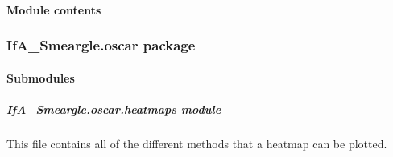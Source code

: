 \documentclass[letterpaper,10pt,english]{sphinxmanual}
\begin{document}
\paragraph{Module contents}
\label{\detokenize{python_docstrings/IfA_Smeargle.meta:module-IfA_Smeargle.meta}}\label{\detokenize{python_docstrings/IfA_Smeargle.meta:module-contents}}

\subsubsection{IfA\_Smeargle.oscar package}
\label{\detokenize{python_docstrings/IfA_Smeargle.oscar:ifa-smeargle-oscar-package}}\label{\detokenize{python_docstrings/IfA_Smeargle.oscar::doc}}

\paragraph{Submodules}
\label{\detokenize{python_docstrings/IfA_Smeargle.oscar:submodules}}

\subparagraph{IfA\_Smeargle.oscar.heatmaps module}
\label{\detokenize{python_docstrings/IfA_Smeargle.oscar.heatmaps:module-IfA_Smeargle.oscar.heatmaps}}\label{\detokenize{python_docstrings/IfA_Smeargle.oscar.heatmaps:ifa-smeargle-oscar-heatmaps-module}}\label{\detokenize{python_docstrings/IfA_Smeargle.oscar.heatmaps::doc}}
This file contains all of the different methods that a heatmap can be plotted.
\end{document}
